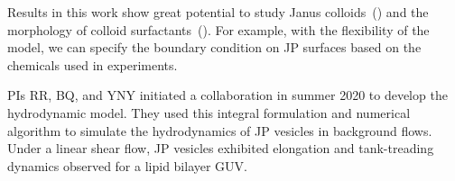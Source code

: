 Results in this work show great potential to study
Janus colloids~(\cite{Bradley2017,Mallory2017})
and the morphology of colloid
surfactants~(\cite{Bradley2016}). 
For example, with the flexibility of the model, we can specify the
boundary condition on JP surfaces based on the chemicals used in
experiments.




%
%

%




PIs RR, BQ, and YNY initiated a collaboration in summer 2020 to develop
the hydrodynamic model.
They  used this integral formulation and numerical
algorithm to simulate the hydrodynamics of JP vesicles in background
flows. Under a linear shear flow, JP vesicles exhibited
elongation and tank-treading dynamics observed for a lipid bilayer GUV.
%
%

